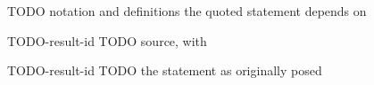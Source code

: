 %
%


\begin{cxcredits}
\end{cxcredits}

\begin{cxcontext}
TODO notation and definitions the quoted statement depends on
\end{cxcontext}


\begin{cxsource}{TODO-result-id}
TODO source, with \cite{key}
\end{cxsource}

\begin{cxstatement}{TODO-result-id}
TODO the statement as originally posed
\end{cxstatement}

